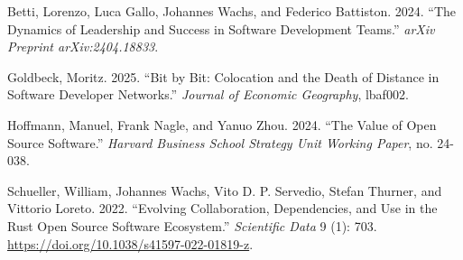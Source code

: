 \documentclass[
  12pt,
]{article}
\newlength{\cslhangindent}
\newenvironment{CSLReferences}[2] %
 {\begin{list}{}{%
  \setlength{\itemindent}{0pt}
  \setlength{\leftmargin}{0pt}
  \setlength{\parsep}{0pt}
  \ifodd #1
   \setlength{\leftmargin}{\cslhangindent}
   \setlength{\itemindent}{-1\cslhangindent}
  \fi
  \setlength{\itemsep}{#2\baselineskip}}}
 {\end{list}}
\begin{document}
\label{refs}
\begin{CSLReferences}{1}{0}
Betti, Lorenzo, Luca Gallo, Johannes Wachs, and Federico Battiston.
2024. {``The Dynamics of Leadership and Success in Software Development
Teams.''} \emph{arXiv Preprint arXiv:2404.18833}.

Goldbeck, Moritz. 2025. {``Bit by Bit: Colocation and the Death of
Distance in Software Developer Networks.''} \emph{Journal of Economic
Geography}, lbaf002.

Hoffmann, Manuel, Frank Nagle, and Yanuo Zhou. 2024. {``The Value of
Open Source Software.''} \emph{Harvard Business School Strategy Unit
Working Paper}, no. 24-038.

Schueller, William, Johannes Wachs, Vito D. P. Servedio, Stefan Thurner,
and Vittorio Loreto. 2022. {``Evolving Collaboration, Dependencies, and
Use in the Rust Open Source Software Ecosystem.''} \emph{Scientific
Data} 9 (1): 703. \url{https://doi.org/10.1038/s41597-022-01819-z}.

\end{CSLReferences}

\setcounter{section}{0}
\renewcommand{\thesection}{\Alph{section}}

\setcounter{table}{0}
\renewcommand{\thetable}{A\arabic{table}}

\setcounter{figure}{0}
\renewcommand{\thefigure}{A\arabic{figure}}
\end{document}
